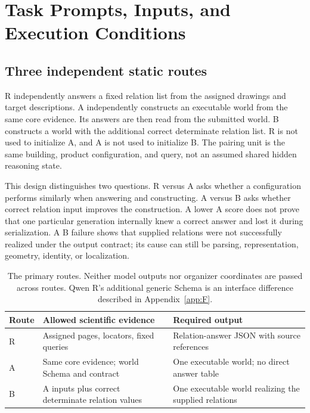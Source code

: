 \section{Task Prompts, Inputs, and Execution Conditions}\label{app:B}
\subsection{Three independent static routes}
R independently answers a fixed relation list from the assigned drawings and target descriptions. A independently constructs an executable world from the same core evidence. Its answers are then read from the submitted world. B constructs a world with the additional correct determinate relation list. R is not used to initialize A, and A is not used to initialize B. The pairing unit is the same building, product configuration, and query, not an assumed shared hidden reasoning state.

This design distinguishes two questions. R versus A asks whether a configuration performs similarly when answering and constructing. A versus B asks whether correct relation input improves the construction. A lower A score does not prove that one particular generation internally knew a correct answer and lost it during serialization. A B failure shows that supplied relations were not successfully realized under the output contract; its cause can still be parsing, representation, geometry, identity, or localization.

\begin{table}[htbp]\centering\small
\begin{tabular}{p{.13\linewidth}p{.35\linewidth}p{.40\linewidth}}\toprule
Route & Allowed scientific evidence & Required output\\\midrule
R & Assigned pages, locators, fixed queries & Relation-answer JSON with source references\\
A & Same core evidence; world Schema and contract & One executable world; no direct answer table\\
B & A inputs plus correct determinate relation values & One executable world realizing the supplied relations\\\bottomrule
\end{tabular}
\caption{The primary routes. Neither model outputs nor organizer coordinates are passed across routes. Qwen R's additional generic Schema is an interface difference described in Appendix~\ref{app:F}.}\label{tab:B-routes}
\end{table}


